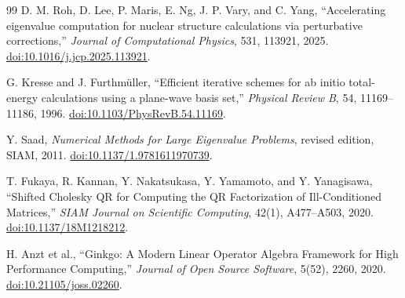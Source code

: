 \documentclass[11pt]{article}
\begin{document}
\begin{thebibliography}{99}
D. M. Roh, D. Lee, P. Maris, E. Ng, J. P. Vary, and C. Yang,
``Accelerating eigenvalue computation for nuclear structure calculations via
perturbative corrections,''
\emph{Journal of Computational Physics}, 531, 113921, 2025.
\href{https://doi.org/10.1016/j.jcp.2025.113921}%
{doi:10.1016/j.jcp.2025.113921}.

G. Kresse and J. Furthm\"uller,
``Efficient iterative schemes for ab initio total-energy calculations using a
plane-wave basis set,''
\emph{Physical Review B}, 54, 11169--11186, 1996.
\href{https://doi.org/10.1103/PhysRevB.54.11169}%
{doi:10.1103/PhysRevB.54.11169}.

Y. Saad,
\emph{Numerical Methods for Large Eigenvalue Problems}, revised edition,
SIAM, 2011.
\href{https://doi.org/10.1137/1.9781611970739}%
{doi:10.1137/1.9781611970739}.

T. Fukaya, R. Kannan, Y. Nakatsukasa, Y. Yamamoto, and Y. Yanagisawa,
``Shifted Cholesky QR for Computing the QR Factorization of Ill-Conditioned
Matrices,''
\emph{SIAM Journal on Scientific Computing}, 42(1), A477--A503, 2020.
\href{https://doi.org/10.1137/18M1218212}{doi:10.1137/18M1218212}.

H. Anzt et al.,
``Ginkgo: A Modern Linear Operator Algebra Framework for High Performance
Computing,''
\emph{Journal of Open Source Software}, 5(52), 2260, 2020.
\href{https://doi.org/10.21105/joss.02260}{doi:10.21105/joss.02260}.

\end{thebibliography}
\end{document}

